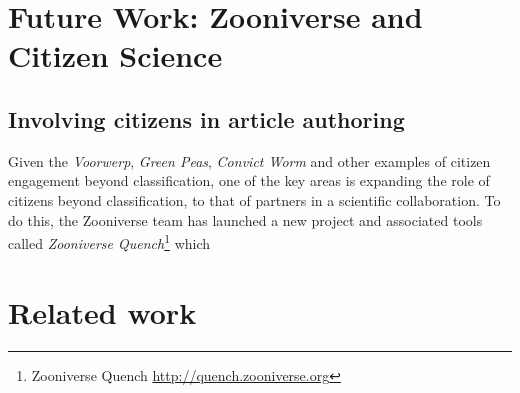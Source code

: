 \documentclass{sigchi}
\begin{document}
%



\section{Future Work: Zooniverse and Citizen Science}

\subsection{Involving citizens in article authoring}

Given the \emph{Voorwerp}, \emph{Green Peas}, \emph{Convict Worm} and other examples of citizen engagement beyond classification, one of the key areas is expanding the role of citizens beyond classification, to that of partners in a scientific collaboration.  To do this, the Zooniverse team has launched a new project and associated tools called \emph{Zooniverse Quench}\footnote{Zooniverse Quench \url{http://quench.zooniverse.org}} which 



\section{Related work}
\end{document}
